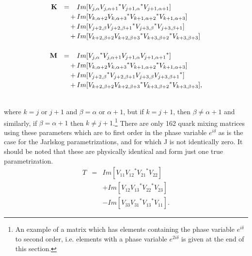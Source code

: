 \documentclass{moriond}
\def\bea{\begin{eqnarray}}
\def\eea{\end{eqnarray}}
\begin{document}
\begin{equation}
\renewcommand{\arraystretch}{1.2}
\begin{array}{rc@{\,}c@{\,}l}

\bf{K} & = &&  Im[V_{j, \alpha} {V_{j,\alpha + 1}}^*
{V_{j + 1,\alpha }}^* V_{j + 1, \alpha + 1} ] \\
       &   & + & Im[V_{k, \alpha + 2} {V_{k,\alpha + 3}}^*
{V_{k + 1,\alpha + 2 }}^* V_{k + 1, \alpha + 3} ]  \\
       &   & + & Im[V_{j + 2, \beta} {V_{j + 2,\beta + 1}}^*
{V_{j + 3,\beta }}^* V_{j + 3, \beta + 1} ]  \\
       &   & + & Im[V_{k + 2, \beta + 2} {V_{k + 2,\beta + 3}}^*
{V_{k + 3,\beta + 2 }}^* V_{k + 3, \beta + 3}] \\
& & \\
\bf{M} & = &&  Im[{V_{j, \alpha}}^* V_{j,\alpha + 1}
V_{j + 1,\alpha } {V_{j + 1, \alpha + 1}}^* ]  \\
       &   & + & Im[V_{k, \alpha + 2} {V_{k,\alpha + 3}}^*
{V_{k + 1,\alpha + 2 }}^* V_{k + 1, \alpha + 3} ]  \\
       &   & + & Im[{V_{j + 2, \beta}}^* V_{j + 2,\beta + 1}
V_{j + 3,\beta } {V_{j + 3, \beta + 1}}^* ]  \\
       &   & + & Im[V_{k + 2, \beta + 2} {V_{k + 2,\beta + 3}}^*
{V_{k + 3,\beta + 2 }}^* V_{k + 3, \beta + 3}],
\\ & &
\end{array}
\label{eq:spa}
\end{equation}

where $ k = j$ or $j+1$ and $\beta = \alpha$ or $\alpha+1$, but if
$k = j + 1$, then $\beta \neq \alpha + 1$ and similarly, if
$\beta = \alpha + 1$ then $ k \neq j + 1$.\footnote{An example of a
matrix which has elements
containing the phase variable $e^{i \delta}$ to second order, i.e.
elements with a
phase variable $e^{2i \delta}$ is given at the end of this section.}
   There are only 162 quark mixing matrices using these parameters
which are
to first order in the phase variable $e^{i \delta}$ as is the case for
the Jarlskog parametrizations, and for which J is not identically
zero.
It should be noted that these are physically identical and
form just one true parametrization.
\bea
T & = & Im[V_{11} {V_{12}}^* {V_{21}}^* V_{22}]  \nonumber \\
&  & + Im[V_{12} {V_{13}}^* {V_{22}}^* V_{23}]   \nonumber \\
&  & - Im[V_{33} {V_{31}}^* {V_{13}}^* V_{11}].
\label{eq:sp}
\eea
\end{document}
